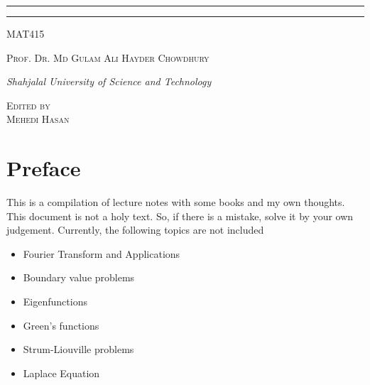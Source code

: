 \documentclass[12pt]{book}
\newcommand{\course}{MAT415}
\newcommand{\prof}{Prof. Dr. Md Gulam Ali Hayder Chowdhury}
\begin{document}
\begin{titlepage}
\rule{345pt}{0.4pt}\vspace*{-\baselineskip}\vspace{3.2pt}
\rule{345pt}{1.6pt}

\vspace{2\baselineskip}

{\scshape \Large{\course}} 

\vspace*{5\baselineskip}



\vspace{0.5\baselineskip} 

{\scshape   \Large \prof\\ }

\vspace{0.75\baselineskip} 

{\textit{\large Shahjalal University of Science and Technology}} 

\vfill 

\vspace{0.3\baselineskip} 


{\scshape \large Edited by\\  Mehedi Hasan} 
\vspace*{40pt}
\end{titlepage}
\newpage
\section*{Preface}
This is a compilation of lecture notes with some books and my own thoughts. This document is not a holy text. So, if there is a mistake, solve it by your own judgement. Currently, the following topics are not included
\begin{itemize}
    \item Fourier Transform and Applications
    \item Boundary value problems
    \item Eigenfunctions
    \item Green's functions
    \item Strum-Liouville problems
    \item Laplace Equation
\end{itemize}

\newpage
\tableofcontents
\newpage
{}
\end{document}
